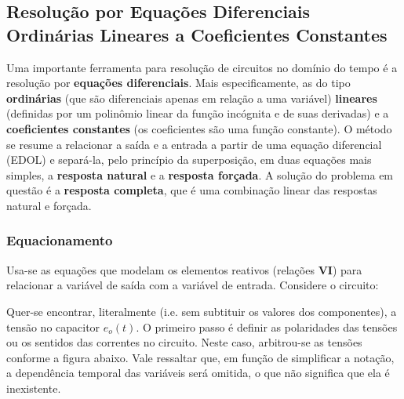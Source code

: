 \documentclass{article}
\numberwithin{equation}{section}
\begin{document}
\subsection{Resolução por Equações Diferenciais Ordinárias Lineares a Coeficientes Constantes}
\label{subsec:edolcc}
Uma importante ferramenta para resolução de circuitos no domínio do tempo é a resolução por \textbf{equações diferenciais}. Mais especificamente, as do tipo \textbf{ordinárias} (que são diferenciais apenas em relação a uma variável) \textbf{lineares} (definidas por um polinômio linear da função incógnita e de suas derivadas) e a \textbf{coeficientes constantes} (os coeficientes são uma função constante). O método se resume a relacionar a saída e a entrada a partir de uma equação diferencial (EDOL) e separá-la, pelo princípio da superposição, em duas equações mais simples, a \textbf{resposta natural} e a \textbf{resposta forçada}. A solução do problema em questão é a \textbf{resposta completa}, que é uma combinação linear das respostas natural e forçada.

\subsubsection{Equacionamento}
\label{subsubsec:equacionamento}
Usa-se as equações que modelam os elementos reativos (relações \textbf{VI}) para relacionar a variável de saída com a variável de entrada. Considere o circuito:

\begin{center}
\end{center}

\noindent Quer-se encontrar, literalmente (i.e. sem subtituir os valores dos componentes), a tensão no capacitor $e_o(t)$. O primeiro passo é definir as polaridades das tensões ou os sentidos das correntes no circuito. Neste caso, arbitrou-se as tensões conforme a figura abaixo. Vale ressaltar que, em função de simplificar a notação, a dependência temporal das variáveis será omitida, o que não significa que ela é inexistente.

\begin{center}
\end{center}
\end{document}

